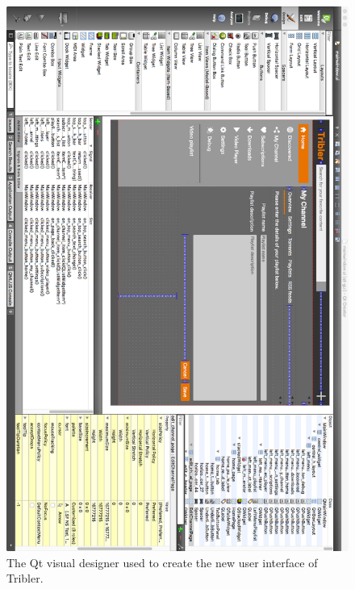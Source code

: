 \begin{figure}[h!]
	\centering
	\includegraphics[width=1.0\columnwidth]{images/improving_qa/qt_designer}
	\caption{The Qt visual designer used to create the new user interface of Tribler.}
	\label{fig:qt-visualizer}
\end{figure}